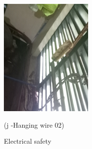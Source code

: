 \begin{figure}[!h]
\begin{minipage}[b]{0.22\linewidth}
		\includegraphics[width=\textwidth]{figures/fig_ch04_fdas_hangingwire03}
		\caption*{(j -Hanging wire 02)}
	\end{minipage}
	\caption{Electrical safety}
	\label{ch05_fig_fdassafety02}
\end{figure}



